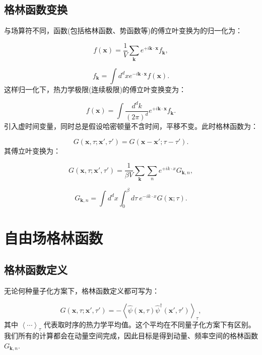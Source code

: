 \documentclass[UTF8]{ctexart}
\begin{document}
\subsection{格林函数变换}

与场算符不同，函数(包括格林函数、势函数等)的傅立叶变换为的归一化为：

\begin{equation}
f\left(\bm{x}\right)=\frac{1}{V}\sum_{\bm{k}}e^{+i\bm{k}\cdot\bm{x}}f_{\bm{k}},
\end{equation}

\begin{equation}
f_{\bm{k}}=\int d^{d}xe^{-i\bm{k}\cdot\bm{x}}f\left(\bm{x}\right).
\end{equation}
这样归一化下，热力学极限(连续极限)的傅立叶变换变为：

\begin{equation}
f\left(\bm{x}\right)=\int\frac{d^{d}k}{\left(2\pi\right)^{d}}e^{+i\bm{k}\cdot\bm{x}}f_{\bm{k}}.
\end{equation}
引入虚时间变量，同时总是假设哈密顿量不含时间，平移不变。此时格林函数为：

\begin{equation}
G\left(\bm{x},\tau;\bm{x}',\tau'\right)=G\left(\bm{x}-\bm{x}';\tau-\tau'\right).
\end{equation}
其傅立叶变换为：

\begin{equation}
G\left(\bm{x},\tau;\bm{x}',\tau'\right)=\frac{1}{\beta V}\sum_{\bm{k}}\sum_{n}e^{+ik\cdot x}G_{\bm{k},n},
\end{equation}

\begin{equation}
G_{\bm{k},n}=\int d^{d}x\int_{0}^{\beta}d\tau\ e^{-ik\cdot x}G\left(\bm{x};\tau\right).
\end{equation}


\section{自由场格林函数}

\subsection{格林函数定义}

无论何种量子化方案下，格林函数定义都可写为：

\begin{equation}
G\left(\bm{x},\tau;\bm{x}',\tau'\right)=-\left\langle \hat{\psi}\left(\bm{x},\tau\right)\hat{\psi}^{\dagger}\left(\bm{x}',\tau'\right)\right\rangle _{\tau},
\end{equation}
其中 $\left\langle \cdots\right\rangle _{\tau}$ 代表取时序的热力学平均值。这个平均在不同量子化方案下有区别。我们所有的计算都会在动量空间完成，因此目标是得到动量、频率空间的格林函数
$G_{\bm{k},n}$.
\end{document}
